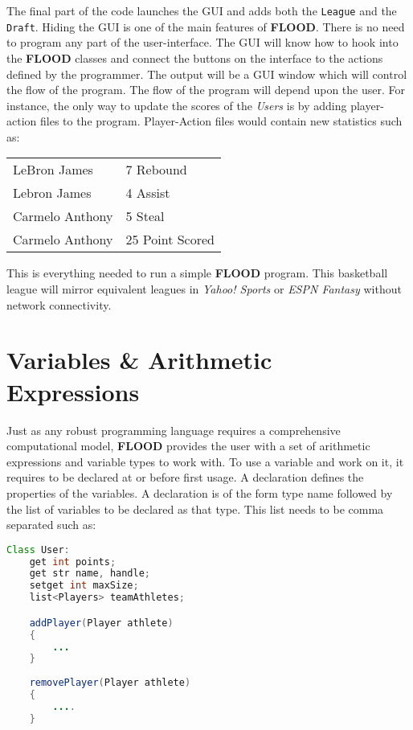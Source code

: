 \documentclass[12pt]{report}
\begin{document}
\begin{doublespace}
The final part of the code launches the GUI and adds both the \texttt{League} and the \texttt{Draft}. Hiding the GUI is one of the main features of \textbf{FLOOD}. There is no need to program any part of the user-interface. The GUI will know how to hook into the \textbf{FLOOD} classes and connect the buttons on the interface to the actions defined by the programmer. The output will be a GUI window which will control the flow of the program. The flow of the program will depend upon the user. For instance, the only way to update the scores of the \textit{Users} is by adding player-action files to the program. Player-Action files would contain new statistics such as:
\begin{center}
\begin{singlespace}
\begin{tabular}{ l l }
LeBron James & 7 Rebound \\
Lebron James & 4 Assist \\
Carmelo Anthony & 5 Steal \\
Carmelo Anthony & 25 Point Scored
\end{tabular}
\end{singlespace}
\end{center}
This is everything needed to run a simple \textbf{FLOOD} program. This basketball league will mirror equivalent leagues in \textit{Yahoo! Sports} or \textit{ESPN Fantasy} without network connectivity.  
\end{doublespace}

\section{Variables \& Arithmetic Expressions}

\begin{doublespace}
Just as any robust programming language requires a comprehensive computational model, \textbf{FLOOD} provides the user with a set of arithmetic expressions and variable types to work with. To use a variable and work on it, it requires to be declared at or before first usage. A declaration defines the properties of the variables. A declaration is of the form type name followed by the list of variables to be declared as that type. This list needs to be comma separated such as:
\end{doublespace}

\begin{lstlisting}[language=Java,label=some-code,caption=User.fld]
Class User:
	get int points;
	get str name, handle;
	setget int maxSize;
	list<Players> teamAthletes;

	addPlayer(Player athlete)
	{
		...
	}
	
	removePlayer(Player athlete)
	{
		....
	}
\end{lstlisting}
\end{document}
